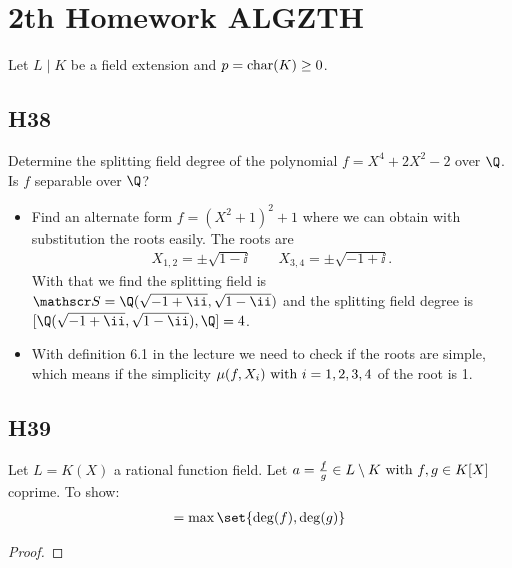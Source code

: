 
\section{2th Homework ALGZTH}
Let $L\mid K$ be a field extension and $p = \operatorname{char}(K) \ge 0$.
\subsection{H38}
Determine the splitting field degree of the polynomial $f = X^4 +2X^2 -2$ over $\Q$. Is $f$ separable over $\Q$?
\begin{solution}
	\begin{itemize}
		\item Find an alternate form $f = (X^2+1)^2+1$ where we can obtain with substitution the roots easily. The roots are
		\begin{align*}
			X_{1,2} = \pm \sqrt{1-\ii} \qquad X_{3,4} = \pm \sqrt{-1+\ii}.
		\end{align*}
		With that we find the splitting field is $\Split = \Q(\sqrt{-1+\ii}, \sqrt{1-\ii})$ and the splitting field degree is $[\Q(\sqrt{-1+\ii}, \sqrt{1-\ii}), \Q] = 4$.\\ 
		\item With definition 6.1 in the lecture we need to check if the roots are simple, which means if the simplicity $\mu(f,X_i) \text{ with } i = 1,2,3,4$ of the root is 1. 
	\end{itemize}
\end{solution}

\subsection{H39}
Let $L = K(X)$ a rational function field. Let $a = \frac{f}{g} \in L \setminus K \text{ with } f,g \in K[X]$ coprime. To show:
\begin{align*}
	[L:K(a)] = \max\set{\deg(f),\deg(g)}
\end{align*}
\begin{proof}
	
\end{proof}


